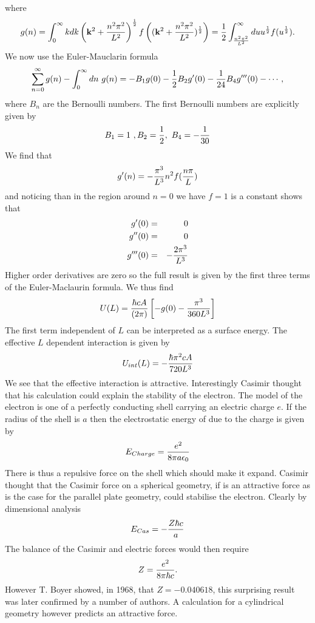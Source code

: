 where
\begin{equation}
g(n) = \int_0^\infty   kdk \left({\bf k}^2 + {n^2\pi^2\over L^2}\right)^{1\over 2} f\left(({\bf k}^2 + {n^2\pi^2\over L^2})^{1\over 2}\right) = {1\over 2}\int_{n^2\pi^2\over L^2}^\infty du u^{1\over 2} f(u^{1\over 2}).
\end{equation}
We now use the Euler-Mauclarin formula
\begin{equation}
\sum_{n=0}^\infty g(n) -\int_0^\infty dn \ g(n) = -B_1g(0) -{1\over 2} B_2 g'(0) - {1\over 24} B_4 g'''(0) - \cdots,
\end{equation}
where $B_n$ are the Bernoulli numbers. The first Bernoulli numbers are explicitly given by
\begin{equation}
B_1 =1\ , B_2 = {1\over 2} ,\ B_4 = -{1\over 30}
\end{equation}
We find that
\begin{equation}
g'(n) = -{\pi^3\over L^3} n^2 f({n\pi\over L})
\end{equation}
and noticing than in the region around $n=0$ we have $f=1$ is a constant shows that
\begin{eqnarray}
g'(0) &=& 0 \\
g''(0) &=& 0 \\
g'''(0) &=& -{2\pi^3\over L^3}
\end{eqnarray}
Higher order derivatives are zero so the full result is given by the first three terms of the Euler-Maclaurin formula. We thus find
\begin{equation}
U(L) = {\hbar c A\over (2\pi)}\left[ -g(0) -{\pi^3\over 360 L^3}\right]
\end{equation}
The first term independent of $L$ can be interpreted as a surface energy. The effective $L$ dependent interaction is given by
\begin{equation}
U_{int}(L) = -{\hbar \pi^2 c A\over 720 L^3}
\end{equation}
We see that the effective interaction is attractive. Interestingly Casimir thought that his calculation could explain the stability of the electron. The model of the electron is one of a perfectly conducting shell carrying an electric charge $e$. If the radius of the shell is $a$ then the electrostatic energy of due to the charge is given by
\begin{equation}
E_{Charge} = {e^2\over 8\pi a\epsilon_0}
\end{equation}
There is thus a repulsive force on the shell which should make it expand. Casimir thought that the Casimir force on a spherical geometry,   
if is an attractive force as is the case for the parallel plate geometry, could stabilise the electron. Clearly by dimensional analysis
\begin{equation}
E_{Cas} = -{Z\hbar c\over a}
\end{equation}
The balance of the Casimir and electric forces would then require
\begin{equation}
Z = {e^2\over 8\pi \hbar c}.
\end{equation}
However T. Boyer showed, in 1968, that $Z = -0.040618$, this surprising result was later confirmed by a number of authors. A calculation for a cylindrical geometry however predicts
an attractive force. 


